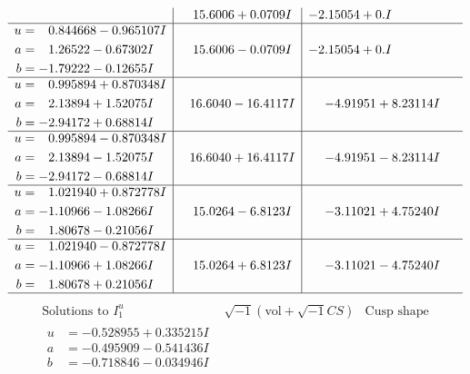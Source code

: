 \documentclass[1p]{elsarticle_modified}
\theoremstyle{definition}
\newcommand{\I}{\sqrt{-1}}
\begin{document}
$$\begin{array}{c|c|c}
 & \phantom{-}15.6006 + 0.0709 I & -2.15054 + 0. I\phantom{ +0.000000I} \\ \hline\begin{aligned}
u &= \phantom{-}0.844668 - 0.965107 I \\
a &= \phantom{-}1.26522 - 0.67302 I \\
b &= -1.79222 - 0.12655 I\end{aligned}
 & \phantom{-}15.6006 - 0.0709 I & -2.15054 + 0. I\phantom{ +0.000000I} \\ \hline\begin{aligned}
u &= \phantom{-}0.995894 + 0.870348 I \\
a &= \phantom{-}2.13894 + 1.52075 I \\
b &= -2.94172 + 0.68814 I\end{aligned}
 & \phantom{-}16.6040 - 16.4117 I & -4.91951 + 8.23114 I \\ \hline\begin{aligned}
u &= \phantom{-}0.995894 - 0.870348 I \\
a &= \phantom{-}2.13894 - 1.52075 I \\
b &= -2.94172 - 0.68814 I\end{aligned}
 & \phantom{-}16.6040 + 16.4117 I & -4.91951 - 8.23114 I \\ \hline\begin{aligned}
u &= \phantom{-}1.021940 + 0.872778 I \\
a &= -1.10966 - 1.08266 I \\
b &= \phantom{-}1.80678 - 0.21056 I\end{aligned}
 & \phantom{-}15.0264 - 6.8123 I & -3.11021 + 4.75240 I \\ \hline\begin{aligned}
u &= \phantom{-}1.021940 - 0.872778 I \\
a &= -1.10966 + 1.08266 I \\
b &= \phantom{-}1.80678 + 0.21056 I\end{aligned}
 & \phantom{-}15.0264 + 6.8123 I & -3.11021 - 4.75240 I\\
 \hline 
 \end{array}$$\newpage$$\begin{array}{c|c|c}  
\text{Solutions to }I^u_{1}& \I (\text{vol} + \sqrt{-1}CS) & \text{Cusp shape}\\
 \hline 
\begin{aligned}
u &= -0.528955 + 0.335215 I \\
a &= -0.495909 - 0.541436 I \\
b &= -0.718846 - 0.034946 I\end{aligned}

\end{array}$$
\end{document}
